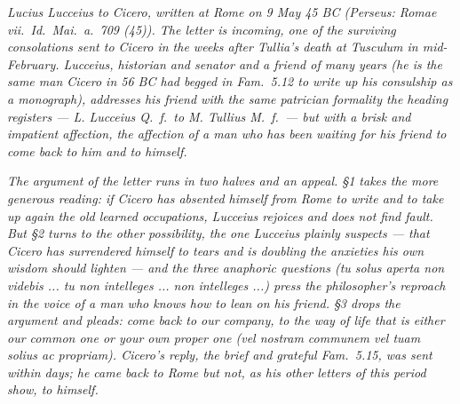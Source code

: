 
\textit{Lucius Lucceius to Cicero, written at Rome on 9 May
45 BC (Perseus: \textit{Romae vii.~Id.~Mai.~a.~709 (45)}). The
letter is incoming, one of the surviving consolations sent to
Cicero in the weeks after Tullia's death at Tusculum in
mid-February. Lucceius, historian and senator and a friend of
many years (he is the same man Cicero in 56 BC had begged in
\textit{Fam.}~5.12 to write up his consulship as a monograph),
addresses his friend with the same patrician formality the
heading registers --- \textit{L. Lucceius Q.~f.}\ to \textit{M.
Tullius M.~f.}\ --- but with a brisk and impatient affection,
the affection of a man who has been waiting for his friend to
come back to him and to himself.}

\textit{The argument of the letter runs in two halves and an
appeal. \S 1 takes the more generous reading: if Cicero has
absented himself from Rome to write and to take up again the
old learned occupations, Lucceius rejoices and does not find
fault. But \S 2 turns to the other possibility, the one
Lucceius plainly suspects --- that Cicero has surrendered
himself to tears and is doubling the anxieties his own wisdom
should lighten --- and the three anaphoric questions
(\textit{tu solus aperta non videbis ... tu non intelleges ...
non intelleges ...}) press the philosopher's reproach in the
voice of a man who knows how to lean on his friend. \S 3 drops
the argument and pleads: come back to our company, to the way
of life that is either our common one or your own proper one
(\textit{vel nostram communem vel tuam solius ac propriam}).
Cicero's reply, the brief and grateful \textit{Fam.}~5.15, was
sent within days; he came back to Rome but not, as his other
letters of this period show, to himself.}
